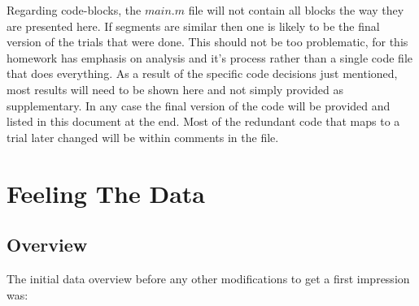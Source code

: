 \documentclass[12pt, a4paper]{article}
\begin{document}
Regarding code-blocks, the $main.m$ file will not contain all blocks the way they are presented here. If segments are similar then one is likely to be the final version of the trials that were done. This should not be too problematic, for this homework has emphasis on analysis and it's process rather than a single code file that does everything. As a result of the specific code decisions just mentioned, most results will need to be shown here and not simply provided as supplementary. In any case the final version of the code will be provided and listed in this document at the end. Most of the redundant code that maps to a trial later changed will be within comments in the file.

\section{Feeling The Data} \label{Introduction}

\subsection{Overview} \label{stats}

The initial data overview before any other modifications to get a first impression was:

\begin{table}[H]
    \centering
    \caption{Statistical representation of data: Country-data.csv}
    \label{tab:stats}
\end{table}
\end{document}
